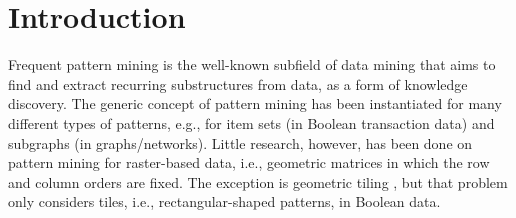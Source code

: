 \documentclass{llncs}
\begin{document}
\section{Introduction}

Frequent pattern mining \cite{aggarwal2014fpm} is the well-known subfield of data mining that aims to find and extract recurring substructures from data, as a form of knowledge discovery. The generic concept of pattern mining has been instantiated for many different types of patterns, e.g., for item sets (in Boolean transaction data) and subgraphs (in graphs/networks). Little research, however, has been done on pattern mining for raster-based data, i.e., geometric matrices in which the row and column orders are fixed. The exception is geometric tiling \cite{gionis2004tiles,tatti2012stijl}, but that problem only considers tiles, i.e., rectangular-shaped patterns, in Boolean data.
\end{document}
